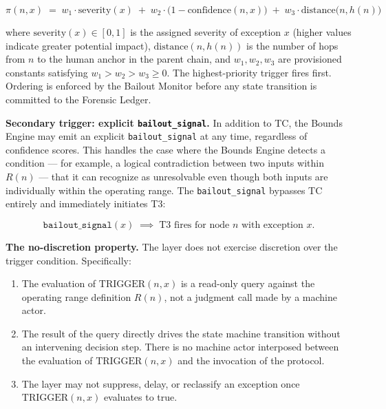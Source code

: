 \begin{equation}
\pi(n, x) \;=\; w_1 \cdot \text{severity}(x) \;+\; w_2 \cdot \bigl(1 - \text{confidence}(n, x)\bigr) \;+\; w_3 \cdot \text{distance}\bigl(n, h(n)\bigr) \tag{PF}
\end{equation}

where $\text{severity}(x) \in [0, 1]$ is the assigned severity of exception $x$ (higher values indicate greater potential impact), $\text{distance}(n, h(n))$ is the number of hops from $n$ to the human anchor in the parent chain, and $w_1, w_2, w_3$ are provisioned constants satisfying $w_1 > w_2 > w_3 \geq 0$. The highest-priority trigger fires first. Ordering is enforced by the Bailout Monitor before any state transition is committed to the Forensic Ledger.

\bigskip
\noindent\textbf{Secondary trigger: explicit \texttt{bailout\_signal}.} In addition to TC, the Bounds Engine may emit an explicit \texttt{bailout\_signal} at any time, regardless of confidence scores. This handles the case where the Bounds Engine detects a condition — for example, a logical contradiction between two inputs within $R(n)$ — that it can recognize as unresolvable even though both inputs are individually within the operating range. The \texttt{bailout\_signal} bypasses TC entirely and immediately initiates T3:

\begin{equation}
\texttt{bailout\_signal}(x) \;\implies\; \text{T3 fires for node } n \text{ with exception } x. \tag{TC-secondary}
\end{equation}

\bigskip
\noindent\textbf{The no-discretion property.} The \bounds{} layer does not exercise discretion over the trigger condition. Specifically:

\begin{enumerate}
    \item The evaluation of $\text{TRIGGER}(n, x)$ is a read-only query against the operating range definition $R(n)$, not a judgment call made by a machine actor.
    \item The result of the query directly drives the state machine transition without an intervening decision step. There is no machine actor interposed between the evaluation of $\text{TRIGGER}(n, x)$ and the invocation of the protocol.
    \item The \bounds{} layer may not suppress, delay, or reclassify an exception once $\text{TRIGGER}(n, x)$ evaluates to true.
\end{enumerate}

